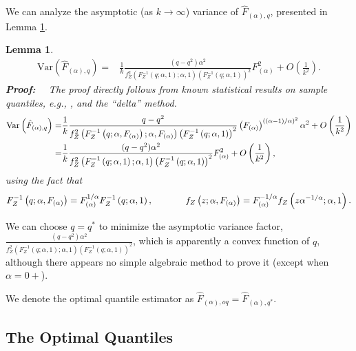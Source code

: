 \documentclass[oneside,10pt]{article}
\newtheorem{lemma}{Lemma}
\begin{document}
We can analyze the asymptotic (as $k\rightarrow \infty$) variance of $\hat{F}_{(\alpha),q}$, presented in Lemma \ref{lem_q_var}.
\begin{lemma}\label{lem_q_var}
\begin{align}\label{eqn_q_var}
\text{Var}\left(\hat{F}_{(\alpha),q}\right)
=&\frac{1}{k}\frac{(q-q^2)\alpha^2}{f^2_Z\left(F_Z^{-1}\left(q;\alpha,1\right);\alpha,1\right) \left(F_Z^{-1}\left(q;\alpha,1\right)\right)^2 } F_{(\alpha)}^2+O\left(\frac{1}{k^2}\right).
\end{align}
\textbf{Proof:} \ \ The proof directly follows from known statistical results on sample quantiles, e.g., \cite[Theorem
9.2]{Book:David}, and the ``delta'' method.
\begin{align}\notag
\text{Var}\left(\hat{F}_{(\alpha),q}\right)
=& \frac{1}{k}\frac{q-q^2}{f^2_Z\left(F_Z^{-1}\left(q;\alpha,F_{(\alpha)}\right);\alpha,F_{(\alpha)}\right) \left(F_Z^{-1}\left(q;\alpha,1\right)\right)^2 } \left(F_{(\alpha)}\right)^{\left((\alpha-1)/\alpha\right)^2}\alpha^2+O\left(\frac{1}{k^2}\right)\\\notag
=&\frac{1}{k}\frac{(q-q^2)\alpha^2}{f^2_Z\left(F_Z^{-1}\left(q;\alpha,1\right);\alpha,1\right) \left(F_Z^{-1}\left(q;\alpha,1\right)\right)^2 } F_{(\alpha)}^2+O\left(\frac{1}{k^2}\right),
\end{align}
\noindent using the fact that
\begin{align}\notag
F_Z^{-1}\left(q; \alpha, F_{(\alpha)}\right) = F_{(\alpha)}^{1/\alpha} F_Z^{-1}\left(q; \alpha,1\right), \hspace{0.5in}
f_Z\left(z; \alpha, F_{(\alpha)}\right) = F_{(\alpha)}^{-1/\alpha} f_Z\left(z\alpha^{-1/\alpha}; \alpha, 1\right).
\end{align}
\end{lemma}


We can choose $q=q^*$ to minimize the asymptotic variance factor,
$\frac{(q-q^2)\alpha^2}{f^2_Z\left(F_Z^{-1}\left(q;\alpha,1\right);\alpha,1\right) \left(F_Z^{-1}\left(q;\alpha,1\right)\right)^2 }$, which is apparently a convex function of $q$, although there appears no simple algebraic method to prove it (except when $\alpha = 0+$).

We denote the optimal quantile estimator as $\hat{F}_{(\alpha),oq} = \hat{F}_{(\alpha),q^*}$.

\subsection{The Optimal Quantiles}
\end{document}
